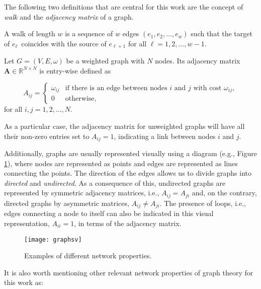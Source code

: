 The following two definitions that are central for this work are the concept of \textit{walk} and the \textit{adjacency matrix} of a graph.  

\begin{definition}
    A walk of length $w$ is a sequence of $w$ edges $(e_1, e_2, \dots, e_w)$ such that the target of $e_\ell$ coincides with the source of $e_{\ell+1}$ for all $\ell=1, 2, ..., w−1$.
\end{definition}
  
\begin{definition}
	Let $G =(V, E, \omega)$ be a weighted graph with $N$ nodes. Its adjacency matrix $\mathbf{A}\in\mathbb{R}^{N\times N}$ is entry-wise defined as
 
 \begin{equation}
  A_{ij} =
    \begin{cases}
      \omega_{ij} & \text{if there is an edge between nodes $i$ and $j$ with cost $\omega_{ij}$},\\
      0 & \text{otherwise},
    \end{cases}       
\end{equation}
for all $i, j = 1,2,\dots, N$.
\end{definition}

As a particular case, the adjacency matrix for unweighted graphs will have all their non-zero entries set to $A_{ij}=1$, indicating a link between nodes $i$ and $j$.

Additionally, graphs are usually represented visually using a diagram (e.g., Figure \ref{fig:graphsv}), where nodes are represented as points and edges are represented as lines connecting the points. The direction of the edges allows us to divide graphs into \textit{directed} and \textit{undirected}. As a consequence of this, undirected graphs are represented by symmetric adjacency matrices, i.e., $A_{ij}=A_{ji}$ and, on the contrary, directed graphs by asymmetric matrices, $A_{ij}\ne A_{ji}$. The presence of loops, i.e., edges connecting a node to itself can also be indicated in this visual representation, $A_{ii} = 1$, in terms of the adjacency matrix.

\begin{figure}[h]\centering
	\texttt{[image: graphsv]}
	\caption{Examples of different network properties.}
	\label{fig:graphsv}
	\bigskip
\end{figure}

It is also worth mentioning other relevant network properties of graph theory for this work as:

